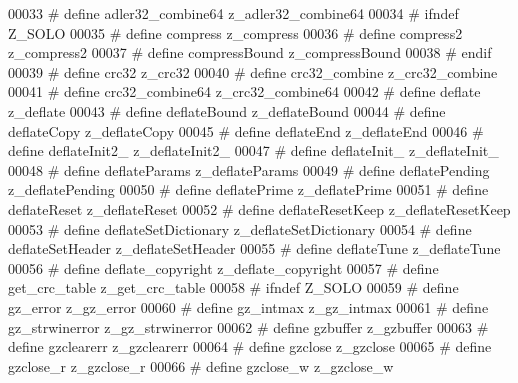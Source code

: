 \begin{DoxyCode}
00033 \textcolor{preprocessor}{#  define adler32\_combine64     z\_adler32\_combine64}
00034 \textcolor{preprocessor}{#  ifndef Z\_SOLO}
00035 \textcolor{preprocessor}{#    define compress              z\_compress}
00036 \textcolor{preprocessor}{#    define compress2             z\_compress2}
00037 \textcolor{preprocessor}{#    define compressBound         z\_compressBound}
00038 \textcolor{preprocessor}{#  endif}
00039 \textcolor{preprocessor}{#  define crc32                 z\_crc32}
00040 \textcolor{preprocessor}{#  define crc32\_combine         z\_crc32\_combine}
00041 \textcolor{preprocessor}{#  define crc32\_combine64       z\_crc32\_combine64}
00042 \textcolor{preprocessor}{#  define deflate               z\_deflate}
00043 \textcolor{preprocessor}{#  define deflateBound          z\_deflateBound}
00044 \textcolor{preprocessor}{#  define deflateCopy           z\_deflateCopy}
00045 \textcolor{preprocessor}{#  define deflateEnd            z\_deflateEnd}
00046 \textcolor{preprocessor}{#  define deflateInit2\_         z\_deflateInit2\_}
00047 \textcolor{preprocessor}{#  define deflateInit\_          z\_deflateInit\_}
00048 \textcolor{preprocessor}{#  define deflateParams         z\_deflateParams}
00049 \textcolor{preprocessor}{#  define deflatePending        z\_deflatePending}
00050 \textcolor{preprocessor}{#  define deflatePrime          z\_deflatePrime}
00051 \textcolor{preprocessor}{#  define deflateReset          z\_deflateReset}
00052 \textcolor{preprocessor}{#  define deflateResetKeep      z\_deflateResetKeep}
00053 \textcolor{preprocessor}{#  define deflateSetDictionary  z\_deflateSetDictionary}
00054 \textcolor{preprocessor}{#  define deflateSetHeader      z\_deflateSetHeader}
00055 \textcolor{preprocessor}{#  define deflateTune           z\_deflateTune}
00056 \textcolor{preprocessor}{#  define deflate\_copyright     z\_deflate\_copyright}
00057 \textcolor{preprocessor}{#  define get\_crc\_table         z\_get\_crc\_table}
00058 \textcolor{preprocessor}{#  ifndef Z\_SOLO}
00059 \textcolor{preprocessor}{#    define gz\_error              z\_gz\_error}
00060 \textcolor{preprocessor}{#    define gz\_intmax             z\_gz\_intmax}
00061 \textcolor{preprocessor}{#    define gz\_strwinerror        z\_gz\_strwinerror}
00062 \textcolor{preprocessor}{#    define gzbuffer              z\_gzbuffer}
00063 \textcolor{preprocessor}{#    define gzclearerr            z\_gzclearerr}
00064 \textcolor{preprocessor}{#    define gzclose               z\_gzclose}
00065 \textcolor{preprocessor}{#    define gzclose\_r             z\_gzclose\_r}
00066 \textcolor{preprocessor}{#    define gzclose\_w             z\_gzclose\_w}

\end{DoxyCode}
